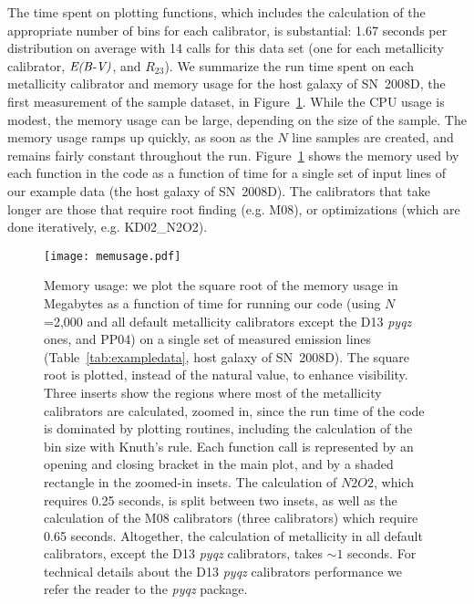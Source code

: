 \documentclass{emulateapj} \usepackage{amsmath} \usepackage{float}
\newcommand{\ebmv}{\ensuremath{\mathrm{\emph{E(B-V)}}}}
\begin{document}
The time spent on plotting functions, which includes the calculation
of the appropriate number of bins for each calibrator, is substantial:
1.67 seconds per distribution on average with 14 calls for this data
set (one for each metallicity calibrator, \ebmv, and $R_{23}$).  We
summarize the run time spent on each metallicity calibrator and memory
usage for the host galaxy of SN~2008D, the first measurement of the
sample dataset, in Figure~\ref{fig:mem}. While the CPU usage is
modest, the memory usage can be large, depending on the size of the
sample.  The memory usage ramps up quickly, as soon as the $N$ line
samples are created, and remains fairly constant throughout the run.
Figure~\ref{fig:mem} shows the memory used by each function in the
code as a function of time for a single set of input lines of our
example data (the host galaxy of SN~2008D). The calibrators that take
longer are those that require root finding (e.g. M08), or
optimizations (which are done iteratively, e.g. KD02\_N2O2).

\begin{figure}[ht!]
  \texttt{[image: memusage.pdf]}
   \caption{Memory usage: we plot the square root of the memory usage
     in Megabytes as a function of time for running our code (using
     $N$=2,000 and all default metallicity calibrators except the D13
     \emph{pyqz} ones, and PP04) on a single set of measured emission lines
     (Table~\ref{tab:exampledata}, host galaxy of SN~2008D). The
     square root is plotted, instead of the natural value, to enhance
     visibility.  Three inserts show the regions where most of the
     metallicity calibrators are calculated, zoomed in, since the run
     time of the code is dominated by plotting routines, including the
     calculation of the bin size with Knuth's rule.  Each function
     call is represented by an opening and closing bracket in the main
     plot, and by a shaded rectangle in the zoomed-in insets.  The
     calculation of $N2O2$, which requires 0.25 seconds, is split
     between two insets, as well as the calculation of the M08
     calibrators (three calibrators) which require 0.65
     seconds. Altogether, the calculation of metallicity in all
     default calibrators, except the D13 \emph{pyqz} calibrators,
     takes $\sim1$ seconds. For technical details about the D13
     \emph{pyqz} calibrators performance we refer the reader to the
     \emph{pyqz} package.}
 \label{fig:mem}
\end{figure}
\end{document}
